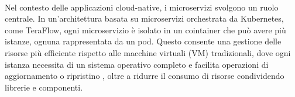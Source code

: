 \\Nel contesto delle applicazioni cloud-native, i microservizi svolgono un ruolo centrale.
In un'architettura basata su microservizi orchestrata da Kubernetes, come TeraFlow,  %
ogni microservizio è isolato in un cointainer che può avere più istanze, ognuna rappresentata da un pod.
Questo consente una gestione delle risorse più efficiente rispetto alle macchine virtuali (VM) tradizionali,
dove ogni istanza necessita di un sistema operativo completo
e facilita operazioni di aggiornamento o ripristino \cite{artkub}, 
oltre a ridurre il consumo di risorse
condividendo librerie e componenti.


